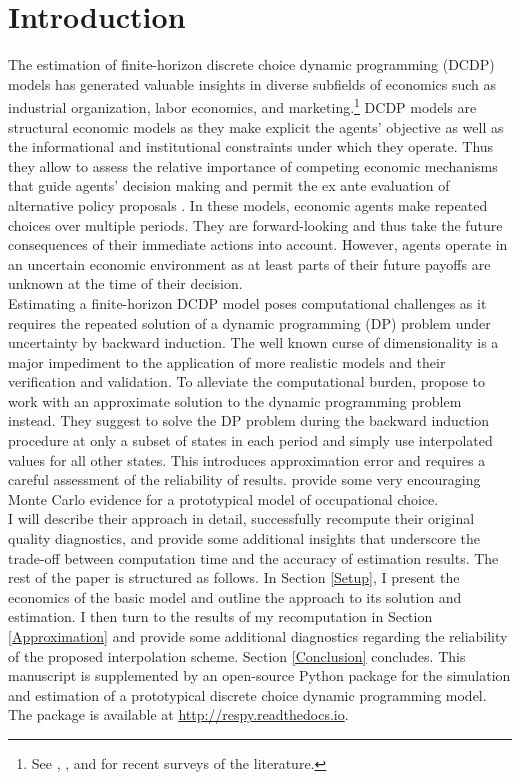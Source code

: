 \section{Introduction}
The estimation of finite-horizon discrete choice dynamic programming (DCDP) models has generated valuable insights in diverse subfields of economics such as industrial organization, labor economics, and marketing.\footnote{See \citet{Keane.2011d}, \citet{Aguirregabiria.2010}, and \citet{Arcidiacono.2011} for recent surveys of the literature.} DCDP models are structural economic models as they make explicit the agents' objective as well as the informational and institutional constraints under which they operate. Thus they allow to assess the relative importance of competing economic mechanisms that guide agents' decision making and permit the ex ante evaluation of alternative policy proposals \citep{Wolpin.2013}. In these models, economic agents make repeated choices over multiple periods. They are forward-looking and thus take the future consequences of their immediate actions into account. However, agents operate in an uncertain economic environment as at least parts of their future payoffs are unknown at the time of their decision.\\\newline
%
Estimating a finite-horizon DCDP model poses computational challenges as it requires the repeated solution of a dynamic programming (DP) problem under uncertainty by backward induction. The well known curse of dimensionality \citep{Bellman.1957} is a major impediment to the application of more realistic models and their verification and validation. To alleviate the computational burden, \citet{Keane.1994} propose to work with an approximate solution to the dynamic programming problem instead. They suggest to solve the DP problem during the backward induction procedure at only a subset of states in each period and simply use interpolated values for all other states. This introduces approximation error and requires a careful assessment of the reliability of results. \citet{Keane.1994} provide some very encouraging Monte Carlo evidence for a prototypical model of occupational choice.\\\newline
%
I will describe their approach in detail, successfully recompute their original quality diagnostics, and provide some additional insights that underscore the trade-off between computation time and the accuracy of estimation results. The rest of the paper is structured as follows. In Section \ref{Setup}, I present the economics of the basic model and outline the approach to its solution and estimation. I then turn to the results of my recomputation in Section \ref{Approximation} and provide some additional diagnostics regarding the reliability of the proposed interpolation scheme. Section \ref{Conclusion} concludes. This manuscript is supplemented by an open-source Python package for the simulation and estimation of a prototypical discrete choice dynamic programming model. The package is available at \url{http://respy.readthedocs.io}.
